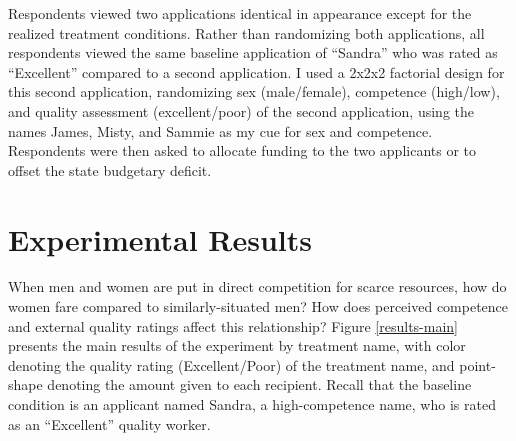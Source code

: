 \documentclass[12pt]{article}%
\begin{document}
\begin{doublespace}
Respondents viewed two applications identical in appearance except for the realized treatment conditions. Rather than randomizing both applications, all respondents viewed the same baseline application of ``Sandra” who was rated as ``Excellent” compared to a second application. I used a 2x2x2 factorial design for this second application, randomizing sex (male/female), competence (high/low), and quality assessment (excellent/poor) of the second application, using the names James, Misty, and Sammie as my cue for sex and competence. Respondents were then asked to allocate funding to the two applicants or to offset the state budgetary deficit.

\section*{Experimental Results}
When men and women are put in direct competition for scarce resources, how do women fare compared to similarly-situated men? How does perceived competence and external quality ratings affect this relationship? Figure \ref{results-main} presents the main results of the experiment by treatment name, with color denoting the quality rating (Excellent/Poor) of the treatment name, and point-shape denoting the amount given to each recipient. Recall that the baseline condition is an applicant named Sandra, a high-competence name, who is rated as an ``Excellent” quality worker.


\end{doublespace}
\end{document}
